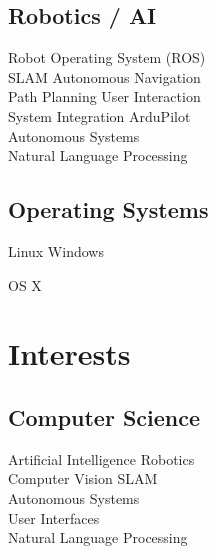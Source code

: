 \documentclass[a4paper]{awesome-deedy}
\begin{document}
\begin{minipage}[t]{0.33\textwidth}
\subsection{Robotics / AI}
\begin{center}
Robot Operating System (ROS) \\
SLAM \textbullet{} Autonomous Navigation \\
Path Planning \textbullet{} User Interaction \\
System Integration \textbullet{} ArduPilot \\
Autonomous Systems\\
Natural Language Processing \\
\end{center}
\sectionsep

\subsection{Operating Systems}
\begin{center}
Linux \textbullet{} Windows \\
\end{center}
\begin{center}
OS X \\
\end{center}
\sectionsep


\section{Interests}
\subsection{Computer Science}
\begin{center}
Artificial Intelligence \textbullet{} Robotics \\
Computer Vision \textbullet{} SLAM \\
Autonomous Systems \\
User Interfaces \\
Natural Language Processing \\
\end{center}
\sectionsep


\end{minipage}
\end{document}
